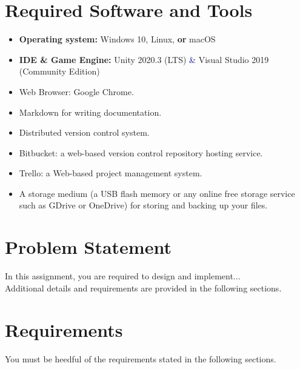\documentclass[11pt, a4paper]{article}
\begin{document}
\section{Required Software and Tools }  
\label{sec:requiredsw}    
\begin{itemize}[itemsep=2pt,parsep=0pt,topsep=2pt,partopsep=2pt]
    \item[\color{darkblue}\faLaptopCode] \textbf{Operating system:} \faWindows {} Windows  10,  \faLinux {} Linux, \textcolor{vanierred}{\textbf{or}} \faApple {} macOS 
    \item[\color{darkblue}\faCode] \textbf{IDE \& Game Engine:} \faUnity Unity \textcolor{vanierred}{2020.3 (LTS)} \textcolor{darkblue}{\&} Visual Studio \textcolor{vanierred}{2019} (Community Edition)
    \item [{\color{darkblue}\faChrome}] Web Browser: Google Chrome.   
    \item[{\color{darkblue} \faWpforms}] Markdown for writing documentation.
    \item[{\color{darkblue} \faGitSquare}] Distributed version control system.
    \item[{\color{darkblue} \faBitbucket}] Bitbucket: a web-based version control repository hosting service.
    \item[{\color{darkblue} \faTrello}] Trello: a Web-based project management system.
    
    \item[\color{darkblue}\faUsb]
    A storage medium (a USB flash memory or any online free storage service such as GDrive or OneDrive) for storing and backing up your files. 
\end{itemize}   

\section{Problem Statement}       
\label{sec:intro}    
\vspace{-.1cm}
\noindent In this assignment, you are required to design and implement...\\
\noindent \blindtext
\noindent Additional details and requirements are provided in the following sections.
          
    \section{Requirements}       
    \label{sec:requirements}    
    \vspace{-.1cm}
    \noindent You must be heedful of the requirements stated in the following sections. 
    
\end{document}

